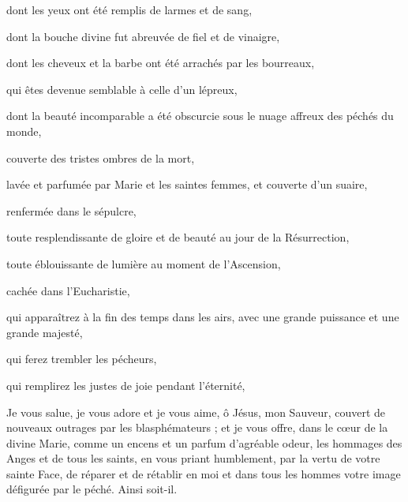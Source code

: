 \documentclass{bibliotheca-missel}
\begin{document}
\begin{litanie}
\item dont les yeux ont été remplis de larmes et de sang,
\item dont la bouche divine fut abreuvée de fiel et de vinaigre,
\item dont les cheveux et la barbe ont été arrachés par les bourreaux,
\item qui êtes devenue semblable à celle d’un lépreux,
\item dont la beauté incomparable a été obscurcie sous le nuage affreux des péchés du monde,
\item couverte des tristes ombres de la mort,
\item lavée et parfumée par Marie et les saintes femmes, et couverte d’un suaire,
\item renfermée dans le sépulcre,
\item toute resplendissante de gloire et de beauté au jour de la Résurrection,
\item toute éblouissante de lumière au moment de l’Ascension,
\item cachée dans l’Eucharistie,
\item qui apparaîtrez à la fin des temps dans les airs, avec une grande puissance et une grande majesté,
\item qui ferez trembler les pécheurs,
\item qui remplirez les justes de joie pendant l’éternité,
\end{litanie}
\priere Je vous salue, je vous adore et je vous aime, ô Jésus, mon Sauveur, couvert de nouveaux outrages par les blasphémateurs ; et je vous offre, dans le cœur de la divine Marie, comme un encens et un parfum d’agréable odeur, les hommages des Anges et de tous les saints, en vous priant humblement, par la vertu de votre sainte Face, de réparer et de rétablir en moi et dans tous les hommes votre image défigurée par le péché. Ainsi soit-il.
\culdelampe
\end{document}
